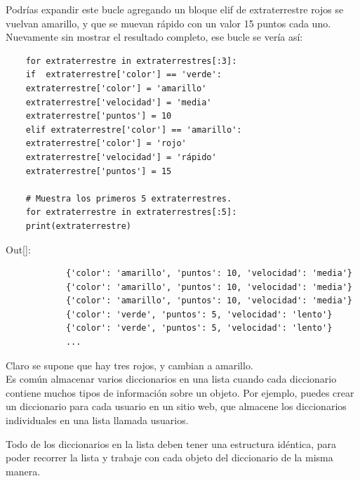 Podrías expandir este bucle agregando un bloque {\ttfamily elif} de extraterrestre  rojos se  vuelvan amarillo, 
y que se muevan rápido con un valor 15 puntos cada uno. Nuevamente sin mostrar el resultado completo, ese bucle se vería así:

\hspace{-2.5cm}{\ttfamily \scriptsize aliens.py} \vspace{-0.5cm}
\begin{lstlisting}
	for extraterrestre in extraterrestres[:3]:
	if  extraterrestre['color'] == 'verde':
	extraterrestre['color'] = 'amarillo'
	extraterrestre['velocidad'] = 'media'
	extraterrestre['puntos'] = 10
	elif extraterrestre['color'] == 'amarillo':
	extraterrestre['color'] = 'rojo'
	extraterrestre['velocidad'] = 'rápido'
	extraterrestre['puntos'] = 15
	
	# Muestra los primeros 5 extraterrestres.
	for extraterrestre in extraterrestres[:5]:
	print(extraterrestre)
\end{lstlisting}	

{\ttfamily\scriptsize\scriptsize \noindent Out[]: \vspace{-0.3cm}	
	{\color{blue} 	
		\begin{verbatim}
			{'color': 'amarillo', 'puntos': 10, 'velocidad': 'media'}
			{'color': 'amarillo', 'puntos': 10, 'velocidad': 'media'}
			{'color': 'amarillo', 'puntos': 10, 'velocidad': 'media'}
			{'color': 'verde', 'puntos': 5, 'velocidad': 'lento'}
			{'color': 'verde', 'puntos': 5, 'velocidad': 'lento'}
			...	
		\end{verbatim}
}}

Claro se supone que hay tres rojos, y cambian a amarillo.\\





Es común almacenar varios diccionarios en una lista cuando cada diccionario contiene muchos tipos de
información sobre un objeto. Por ejemplo, puedes crear un diccionario para cada usuario en un sitio web, 
que almacene los diccionarios individuales en una lista llamada usuarios. 

Todo de los diccionarios en la lista deben tener una estructura idéntica, para poder recorrer la lista y trabaje con cada objeto del diccionario de la misma manera.\\



